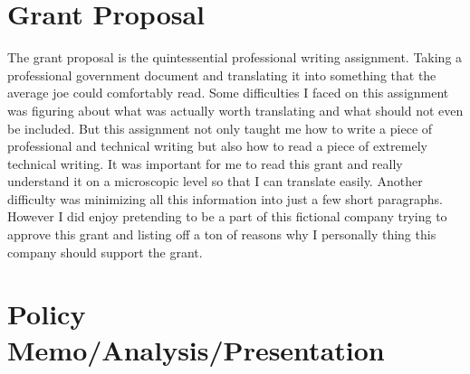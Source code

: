 \documentclass[12pt,letterpaper]{article}
\begin{document}
\newpage
\section{Grant Proposal}
The grant proposal is the quintessential professional writing assignment. Taking a professional government document and translating it into something that the average joe could comfortably read. Some difficulties I faced on this assignment was figuring about what was actually worth translating and what should not even be included. But this assignment not only taught me how to write a piece of professional and technical writing but also how to read a piece of extremely technical writing. It was important for me to read this grant and really understand it on a microscopic level so that I can translate easily. Another difficulty was minimizing all this information into just a few short paragraphs. However I did enjoy pretending to be a part of this fictional company trying to approve this grant and listing off a ton of reasons why I personally thing this company should support the grant. 

\newpage
\section{Policy Memo/Analysis/Presentation}
\end{document}

